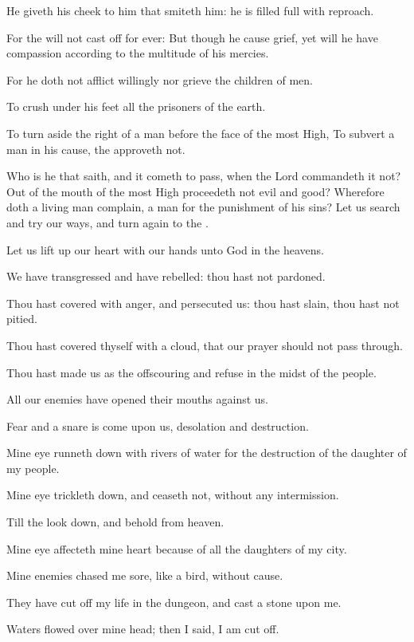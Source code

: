 \Verse He giveth his cheek to him that smiteth him: he is filled full with reproach.

\Verse For the \LORD will not cast off for ever: \Verse But though he cause grief, yet will he have compassion according to the multitude of his mercies.

\Verse For he doth not afflict willingly nor grieve the children of men.

\Verse To crush under his feet all the prisoners of the earth.

\Verse To turn aside the right of a man before the face of the most High, \Verse To subvert a man in his cause, the \LORD approveth not.

\Verse Who is he that saith, and it cometh to pass, when the Lord commandeth it not?  \Verse Out of the mouth of the most High proceedeth not evil and good?  \Verse Wherefore doth a living man complain, a man for the punishment of his sins?  \Verse Let us search and try our ways, and turn again to the \LORD.

\Verse Let us lift up our heart with our hands unto God in the heavens.

\Verse We have transgressed and have rebelled: thou hast not pardoned.

\Verse Thou hast covered with anger, and persecuted us: thou hast slain, thou hast not pitied.

\Verse Thou hast covered thyself with a cloud, that our prayer should not pass through.

\Verse Thou hast made us as the offscouring and refuse in the midst of the people.

\Verse All our enemies have opened their mouths against us.

\Verse Fear and a snare is come upon us, desolation and destruction.

\Verse Mine eye runneth down with rivers of water for the destruction of the daughter of my people.

\Verse Mine eye trickleth down, and ceaseth not, without any intermission.

\Verse Till the \LORD look down, and behold from heaven.

\Verse Mine eye affecteth mine heart because of all the daughters of my city.

\Verse Mine enemies chased me sore, like a bird, without cause.

\Verse They have cut off my life in the dungeon, and cast a stone upon me.

\Verse Waters flowed over mine head; then I said, I am cut off.

